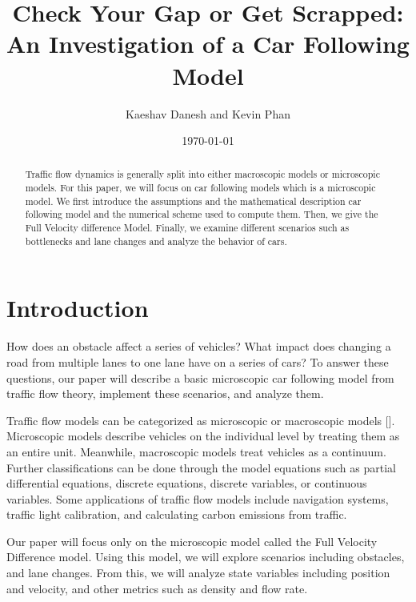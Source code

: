 \documentclass[12pt]{article}
\title{Check Your Gap or Get Scrapped: An Investigation of a Car Following Model}
\author{Kaeshav Danesh and Kevin Phan}
\date{\today}
\begin{document}
    \maketitle

    \begin{abstract}
        Traffic flow dynamics is generally split into either macroscopic models or microscopic models. For this paper, we will focus on car following models which is a microscopic model. We first introduce the assumptions and the mathematical description car following model and the numerical scheme used to compute them. Then, we give the Full Velocity difference Model. Finally, we examine different scenarios such as bottlenecks and lane changes and analyze the behavior of cars. 
    \end{abstract}

    \newpage

    \tableofcontents

    \newpage

    \section{Introduction}
    How does an obstacle affect a series of vehicles? What impact does changing a road from multiple lanes to one lane have on a series of cars? To answer these questions, our paper will describe a basic microscopic car following model from traffic flow theory, implement these scenarios, and analyze them. 

    Traffic flow models can be categorized as microscopic or macroscopic models [\cite{hisTraffic}]. Microscopic models describe vehicles on the individual level by treating them as an entire unit. Meanwhile, macroscopic models treat vehicles as a continuum. Further classifications can be done through the model equations such as partial differential equations, discrete equations, discrete variables, or continuous variables. Some applications of traffic flow models include navigation systems, traffic light calibration, and calculating carbon emissions from traffic. 

    Our paper will focus only on the microscopic model called the Full Velocity Difference model. Using this model, we will explore scenarios including obstacles, and lane changes. From this, we will analyze state variables including position and velocity, and other metrics such as density and flow rate. 
\end{document}
